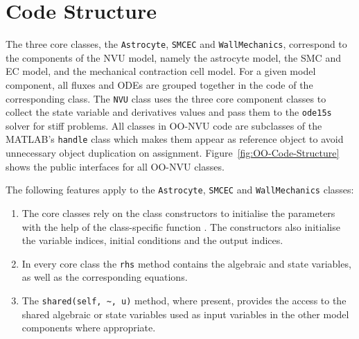 \section{Code Structure}

The three core classes, the \texttt{Astrocyte}, \texttt{SMCEC} and \texttt{WallMechanics}, correspond to the components of the NVU model, namely the astrocyte model, the SMC and EC model, and the mechanical contraction cell model. For a given model component, all fluxes and ODEs are grouped together in the code of the corresponding class. The \texttt{NVU} class uses the three core component classes to collect the state variable and derivatives values and pass them to the \texttt{ode15s} solver for stiff problems. All classes in OO-NVU code are subclasses of the MATLAB's \texttt{handle} class which makes them appear as reference object to avoid unnecessary object duplication on assignment. Figure~\ref{fig:OO-Code-Structure} shows the public interfaces for all OO-NVU classes.


The following features apply to the \texttt{Astrocyte}, \texttt{SMCEC} and \texttt{WallMechanics} classes:

\begin{enumerate}
	\item The core classes rely on the class constructors to initialise the parameters with the help of the class-specific function . The constructors also initialise the variable indices, initial conditions and the output indices.
	
	\item In every core class the \texttt{rhs} method contains the algebraic and state variables, as well as the corresponding equations.
	
	\item The \texttt{shared(self, \~{}, u)} method, where present, provides the access to the shared algebraic or state variables used as input variables in the other model components where appropriate.
\end{enumerate}

